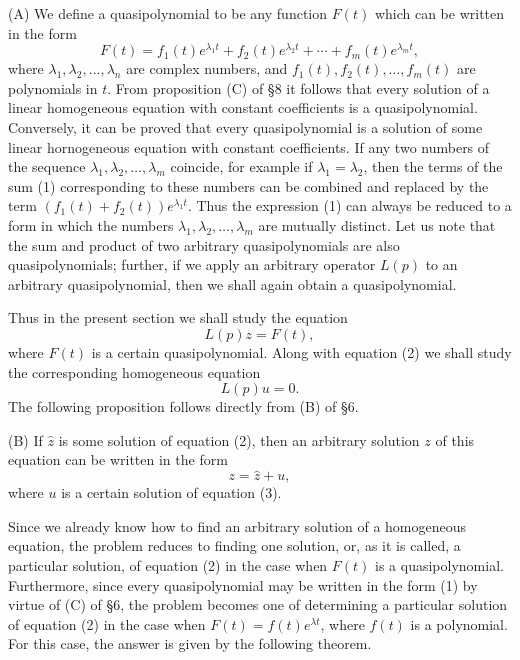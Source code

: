 \documentclass[10pt,a5paper]{book}
\theoremstyle{plain}
\theoremstyle{definition}
\theoremstyle{remark}
\begin{document}
(A) We define a quasipolynomial to be any function $F(t)$ which can be written in the form
\begin{equation*}
F(t)=f_{1}(t) e^{\lambda_{1} t}+f_{2}(t) e^{\lambda_{2} t}+\cdots+f_{m}(t) e^{\lambda_{m} t}, \tag{1}
\end{equation*}
where $\lambda_{1}, \lambda_{2}, \ldots, \lambda_{n}$ are complex numbers, and $f_{1}(t), f_{2}(t), \ldots, f_{m}(t)$ are polynomials in $t$. From proposition (C) of §8 it follows that every solution of a linear homogeneous equation with constant coefficients is a quasipolynomial. Conversely, it can be proved that every quasipolynomial is a solution of some linear hornogeneous equation with constant coefficients. If any two numbers of the sequence $\lambda_{1}, \lambda_{2}, \ldots, \lambda_{m}$ coincide, for example if $\lambda_{1}=\lambda_{2}$, then the terms of the sum (1) corresponding to these numbers can be combined and replaced by the term $\left(f_{1}(t)+f_{2}(t)\right) e^{\lambda_{1} t}$. Thus the expression (1) can always be reduced to a form in which the numbers $\lambda_{1}, \lambda_{2}, \ldots, \lambda_{m}$ are mutually distinct. Let us note that the sum and product of two arbitrary quasipolynomials are also quasipolynomials; further, if we apply an arbitrary operator $L(p)$ to an arbitrary quasipolynomial, then we shall again obtain a quasipolynomial.

Thus in the present section we shall study the equation
\begin{equation*}
L(p) z=F(t), \tag{2}
\end{equation*}
where $F(t)$ is a certain quasipolynomial. Along with equation (2) we shall study the corresponding homogeneous equation
\begin{equation*}
L(p) u=0 . \tag{3}
\end{equation*}
The following proposition follows directly from (B) of §6.

(B) If $\hat{z}$ is some solution of equation (2), then an arbitrary solution $z$ of this equation can be written in the form
\[
z=\hat{z}+u,
\]
where $u$ is a certain solution of equation (3).

Since we already know how to find an arbitrary solution of a homogeneous equation, the problem reduces to finding one solution, or, as it is called, a particular solution, of equation (2) in the case when $F(t)$ is a quasipolynomial. Furthermore, since every quasipolynomial may be written in the form (1) by virtue of (C) of §6, the problem becomes one of determining a particular solution of equation (2) in the case when $F(t)=f(t) e^{\lambda t}$, where $f(t)$ is a polynomial. For this case, the answer is given by the following theorem.
\end{document}
